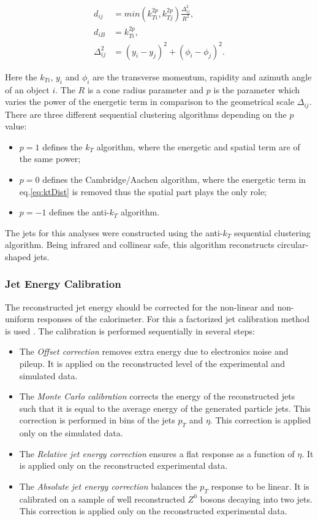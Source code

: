 \begin{align}
 d_{ij} & = min(k_{Ti}^{2p}, k_{Tj}^{2p}) \frac{\Delta_{ij}^{2}}{R^{2}},\label{eq:ktDist} \\
 d_{iB} & = k_{Ti}^{2p}, \\
 \Delta_{ij}^{2} & = (y_{i} - y_{j})^{2} + (\phi_{i} - \phi_{j})^{2}.
\end{align}

Here the $k_{Ti}$, $y_{i}$ and $\phi_i$ are the transverse momentum, rapidity and azimuth angle of an object $i$. The $R$ is a cone radius parameter and 
$p$ is the parameter which varies the power of the energetic term in comparison to the geometrical scale $\Delta_{ij}$.
There are three different sequential clustering algorithms depending on the $p$ value:

\begin{itemize}
 \item $p = 1$ defines the $k_{T}$ algorithm, where the energetic and spatial term are of the same power;
 \item $p = 0$ defines the Cambridge/Aachen algorithm, where the energetic term in eq.\ref{eq:ktDist} is removed thus the spatial part plays the only role;
 \item $p = -1$ defines the anti-$k_{T}$ algorithm.
\end{itemize}

The jets for this analyses were constructed using the anti-$k_{T}$ sequential clustering algorithm. Being infrared and collinear safe, this algorithm reconstructs 
circular-shaped jets.

\subsubsection{Jet Energy Calibration}\label{ssec:JCal}

The reconstructed jet energy should be corrected for the non-linear and non-uniform responses of the calorimeter. For this a factorized jet calibration
method is used \cite{2011JInst...611002C}. The calibration is performed sequentially in several steps:

\begin{itemize}
 \item The \textit{Offset correction} removes extra energy due to electronics noise and pileup. It is applied on the reconstructed level of the 
 experimental and simulated data.
 \item The \textit{Monte Carlo calibration} corrects the energy of the reconstructed jets such that it is equal to the average energy of the generated 
 particle jets. This correction is performed in bins of the jets $p_{T}$ and $\eta$. This correction is applied only on the simulated data.
 \item The \textit{Relative jet energy correction} ensures a flat response as a function of $\eta$. It is applied only on the reconstructed experimental data.
 \item The \textit{Absolute jet energy correction} balances the $p_{T}$ response to be linear. It is calibrated on a sample of well reconstructed $Z^{0}$ bosons 
 decaying into two jets. This correction is applied only on the reconstructed experimental data.
\end{itemize}


